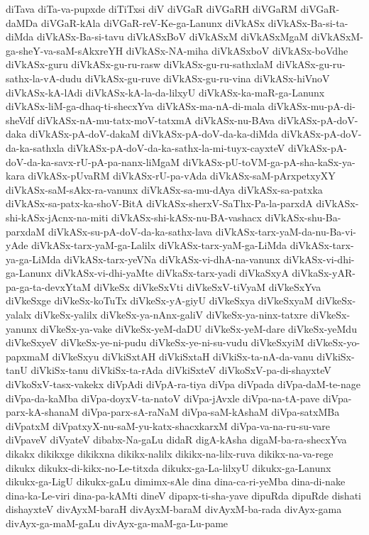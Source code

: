{diTava
diTa-va-pupxde
diTiTxsi
diV
diVGaR
diVGaRH
diVGaRM
diVGaR-daMDa
diVGaR-kAla
diVGaR-reV-Ke-ga-Lanunx
diVkASx
diVkASx-Ba-si-ta-diMda
diVkASx-Ba-si-tavu
diVkASxBoV
diVkASxM
diVkASxMgaM
diVkASxM-ga-sheY-va-saM-sAkxreYH
diVkASx-NA-miha
diVkASxboV
diVkASx-boVdhe
diVkASx-guru
diVkASx-gu-ru-rasw
diVkASx-gu-ru-sathxlaM
diVkASx-gu-ru-sathx-la-vA-dudu
diVkASx-gu-ruve
diVkASx-gu-ru-vina
diVkASx-hiVnoV
diVkASx-kA-lAdi
diVkASx-kA-la-da-lilxyU
diVkASx-ka-maR-ga-Lanunx
diVkASx-liM-ga-dhaq-ti-shecxYva
diVkASx-ma-nA-di-mala
diVkASx-mu-pA-di-sheVdf
diVkASx-nA-mu-tatx-moV-tatxmA
diVkASx-nu-BAva
diVkASx-pA-doV-daka
diVkASx-pA-doV-dakaM
diVkASx-pA-doV-da-ka-diMda
diVkASx-pA-doV-da-ka-sathxla
diVkASx-pA-doV-da-ka-sathx-la-mi-tuyx-cayxteV
diVkASx-pA-doV-da-ka-savx-rU-pA-pa-nanx-liMgaM
diVkASx-pU-toVM-ga-pA-sha-kaSx-ya-kara
diVkASx-pUvaRM
diVkASx-rU-pa-vAda
diVkASx-saM-pArxpetxyXY
diVkASx-saM-sAkx-ra-vanunx
diVkASx-sa-mu-dAya
diVkASx-sa-patxka
diVkASx-sa-patx-ka-shoV-BitA
diVkASx-sherxV-SaThx-Pa-la-parxdA
diVkASx-shi-kASx-jAcnx-na-miti
diVkASx-shi-kASx-nu-BA-vashacx
diVkASx-shu-Ba-parxdaM
diVkASx-su-pA-doV-da-ka-sathx-lava
diVkASx-tarx-yaM-da-nu-Ba-vi-yAde
diVkASx-tarx-yaM-ga-Lalilx
diVkASx-tarx-yaM-ga-LiMda
diVkASx-tarx-ya-ga-LiMda
diVkASx-tarx-yeVNa
diVkASx-vi-dhA-na-vanunx
diVkASx-vi-dhi-ga-Lanunx
diVkASx-vi-dhi-yaMte
diVkaSx-tarx-yadi
diVkaSxyA
diVkaSx-yAR-pa-ga-ta-devxYtaM
diVkeSx
diVkeSxVti
diVkeSxV-tiVyaM
diVkeSxYva
diVkeSxge
diVkeSx-koTuTx
diVkeSx-yA-giyU
diVkeSxya
diVkeSxyaM
diVkeSx-yalalx
diVkeSx-yalilx
diVkeSx-ya-nAnx-galiV
diVkeSx-ya-ninx-tatxre
diVkeSx-yanunx
diVkeSx-ya-vake
diVkeSx-yeM-daDU
diVkeSx-yeM-dare
diVkeSx-yeMdu
diVkeSxyeV
diVkeSx-ye-ni-pudu
diVkeSx-ye-ni-su-vudu
diVkeSxyiM
diVkeSx-yo-papxmaM
diVkeSxyu
diVkiSxtAH
diVkiSxtaH
diVkiSx-ta-nA-da-vanu
diVkiSx-tanU
diVkiSx-tanu
diVkiSx-ta-rAda
diVkiSxteV
diVkoSxV-pa-di-shayxteV
diVkoSxV-tasx-vakekx
diVpAdi
diVpA-ra-tiya
diVpa
diVpada
diVpa-daM-te-nage
diVpa-da-kaMba
diVpa-doyxV-ta-natoV
diVpa-jAvxle
diVpa-na-tA-pave
diVpa-parx-kA-shanaM
diVpa-parx-sA-raNaM
diVpa-saM-kAshaM
diVpa-satxMBa
diVpatxM
diVpatxyX-nu-saM-yu-katx-shacxkarxM
diVpa-va-na-ru-su-vare
diVpaveV
diVyateV
dibabx-Na-gaLu
didaR
digA-kAsha
digaM-ba-ra-shecxYva
dikakx
dikikxge
dikikxna
dikikx-nalilx
dikikx-na-lilx-ruva
dikikx-na-va-rege
dikukx
dikukx-di-kikx-no-Le-titxda
dikukx-ga-La-lilxyU
dikukx-ga-Lanunx
dikukx-ga-LigU
dikukx-gaLu
dimimx-sAle
dina
dina-ca-ri-yeMba
dina-di-nake
dina-ka-Le-viri
dina-pa-kAMti
dineV
dipapx-ti-sha-yave
dipuRda
dipuRde
dishati
dishayxteV
divAyxM-baraH
divAyxM-baraM
divAyxM-ba-rada
divAyx-gama
divAyx-ga-maM-gaLu
divAyx-ga-maM-ga-Lu-pame
}
